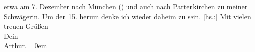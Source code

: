 \begin{ledgroupsized}[t]{13cm}
               etwa am 7. Dezember nach München (\label{K_L01981_5v}\label{K_L01981_5h}) und
               auch nach Partenkirchen zu meiner Schwägerin. Um den 15. herum denke ich wieder daheim zu sein.\pend
           \pstart
           {[}hs.:{]} Mit vielen treuen Grüßen{\\[\baselineskip]}Dein{\\[\baselineskip]}\spacefill\mbox{Arthur.}\pend
           \leftskip=0em{}
         
         \endnumbering{}\end{ledgroupsized}  \newcommand{\dateiname}{L01981}\newcommand{\titel}{Arthur Schnitzler an Hermann Bahr, 17. 11. 1910}\newcommand{\editorInnen}{ Kurt Ifkovits,  Martin Anton Müller}
      